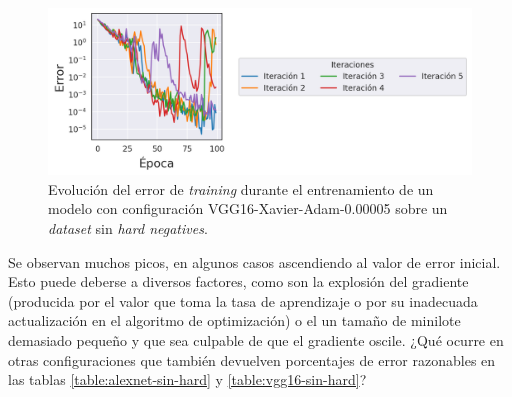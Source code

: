 \begin{figure}[H]
\centering
    \includegraphics[scale=0.6]{imagenes/image_classification/original_dataset/loss_vgg16_xavier_adam_00005.png}
    \caption{Evolución del error de \textit{training} durante el entrenamiento de un modelo con configuración VGG16-Xavier-Adam-0.00005 sobre un \textit{dataset} sin \textit{hard negatives}.}
    \label{fig:loss_vgg16_xavier_adam_00005}
\end{figure}

Se observan muchos picos, en algunos casos ascendiendo al valor de error inicial. Esto puede deberse a diversos factores, como son la explosión del gradiente (producida por el valor que toma la tasa de aprendizaje o por su inadecuada actualización en el algoritmo de optimización) o el un tamaño de minilote demasiado pequeño y que sea culpable de que el gradiente oscile. ¿Qué ocurre en otras configuraciones que también devuelven porcentajes de error razonables en las tablas \ref{table:alexnet-sin-hard} y \ref{table:vgg16-sin-hard}?

